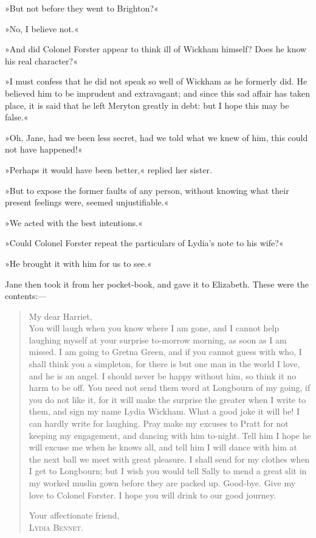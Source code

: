 »But not before they went to Brighton?«

»No, I believe not.«

»And did Colonel Forster appear to think ill of Wickham himself? Does he know his real character?«

»I must confess that he did not speak so well of Wickham as he formerly did. He believed him to be imprudent and extravagant; and since this sad affair has taken place, it is said that he left Meryton greatly in debt: but I hope this may be false.«

»Oh, Jane, had we been less secret, had we told what we knew of him, this could not have happened!«

»Perhaps it would have been better,« replied her sister.

»But to expose the former faults of any person, without knowing what their present feelings were, seemed unjustifiable.«

»We acted with the best intentions.«

»Could Colonel Forster repeat the particulars of Lydia's note to his wife?«

»He brought it with him for us to see.«

Jane then took it from her pocket-book, and gave it to Elizabeth. These were the contents:—


\begin{quotation}
\noindent My dear Harriet,\\

\indent You will laugh when you know where I am gone, and I cannot help laughing myself at your surprise to-morrow morning, as soon as I am missed. I am going to Gretna Green, and if you cannot guess with who, I shall think you a simpleton, for there is but one man in the world I love, and he is an angel. I should never be happy without him, so think it no harm to be off. You need not send them word at Longbourn of my going, if you do not like it, for it will make the surprise the greater when I write to them, and sign my name Lydia Wickham. What a good joke it will be! I can hardly write for laughing. Pray make my excuses to Pratt for not keeping my engagement, and dancing with him to-night. Tell him I hope he will excuse me when he knows all, and tell him I will dance with him at the next ball we meet with great pleasure. I shall send for my clothes when I get to Longbourn; but I wish you would tell Sally to mend a great slit in my worked muslin gown before they are packed up. Good-bye. Give my love to Colonel Forster. I hope you will drink to our good journey.

\begin{flushright}
Your affectionate friend,\\
\textsc{Lydia Bennet.}
\end{flushright}
\end{quotation}


